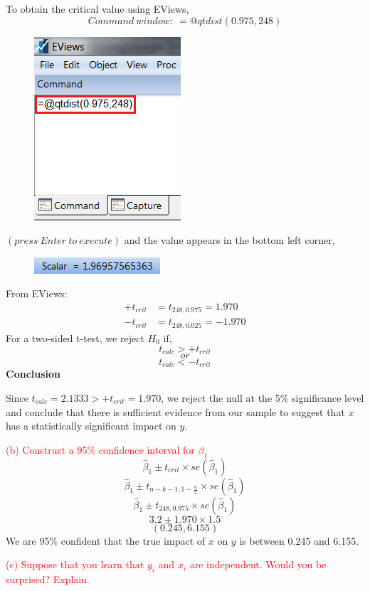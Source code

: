 \documentclass[12pt]{report}
\begin{document}
\noindent To obtain the critical value using EViews,
$$Command\ window:\ =@qtdist(0.975,248)$$
\begin{figure}[H]
	\centering
	\includegraphics{tute6_q2_2}
\end{figure}
\vspace{-\baselineskip}\centering $(press\ Enter\ to\ execute)$
\justify and the value appears in the bottom left corner,
\begin{figure}[H]
	\centering
	\includegraphics{tute6_q2_3}
\end{figure}
\vspace{-\baselineskip}
\noindent From EViews: \begin{align*}
+t_{crit} &= t_{248,0.975} = 1.970 \\
-t_{crit} &= t_{248,0.025} = -1.970
\end{align*}
\noindent For a two-sided t-test, we reject $H_0$ if,
$$t_{calc} > +t_{crit}$$
$$or$$
$$t_{calc} < -t_{crit}$$
\noindent \textbf{Conclusion}

\noindent Since $t_{calc} = 2.1333 > +t_{crit} = 1.970$, we reject the null at the 5\% significance level and conclude that there is sufficient evidence from our sample to suggest that $x$ has a statistically significant impact on $y$.

\newpage
\noindent \textcolor{red}{(b) Construct a 95\% confidence interval for $\beta_1$}
$$\hat{\beta}_1 \pm t_{crit} \times se(\hat{\beta}_1)$$
$$\hat{\beta}_1 \pm t_{n-k-1,1-\frac{\alpha}{2}} \times se(\hat{\beta}_1)$$
$$\hat{\beta}_1 \pm t_{248,0.975} \times se(\hat{\beta}_1)$$
$$3.2 \pm 1.970 \times 1.5$$
$$(0.245,6.155)$$
\noindent We are 95\% confident that the true impact of $x$ on $y$ is between 0.245 and 6.155.

\noindent \textcolor{red}{(c) Suppose that you learn that $y_i$ and $x_i$ are independent. Would you be surprised? Explain.}
\end{document}
